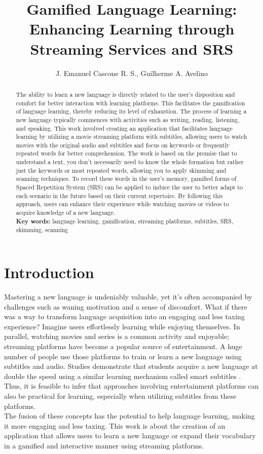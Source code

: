 \documentclass[12pt]{article}
\title{Gamified Language Learning: Enhancing Learning through Streaming Services and SRS}
\author{J. Emanuel Cascone R. S.\inst{1}, Guilherme A. Avelino\inst{1} }
\begin{document}
 

\maketitle

\begin{abstract} 
  The ability to learn a new language is directly related to the user's disposition and comfort for better interaction with learning platforms. This facilitates the gamification of language learning, thereby reducing its level of exhaustion. The process of learning a new language typically commences with activities such as writing, reading, listening, and speaking. This work involved creating an application that facilitates language learning by utilizing a movie streaming platform with subtitles, allowing users to watch movies with the original audio and subtitles and focus on keywords or frequently repeated words for better comprehension. The work is based on the premise that to understand a text, you don't necessarily need to know the whole formation but rather just the keywords or most repeated words, allowing you to apply skimming and scanning techniques. To record these words in the user's memory, gamified forms of Spaced Repetition System (SRS) can be applied to induce the user to better adapt to each scenario in the future based on their current repertoire. By following this approach, users can enhance their experience while watching movies or videos to acquire knowledge of a new language. \\
  \textbf{Key words:} language learning, gamification, streaming platforms, subtitles, SRS, skimming, scanning
\end{abstract} 
\newpage


\section{Introduction} 

Mastering a new language is undeniably valuable, yet it's often accompanied by challenges such as waning motivation and a sense of discomfort. What if there was a way to transform language acquisition into an engaging and less taxing experience? Imagine users effortlessly learning while enjoying themselves. 
In parallel, watching movies and series is a common activity and enjoyable; streaming platforms have become a popular source of entertainment. A huge number of people use those platforms to train or learn a new language using subtitles and audio.
Studies demonstrate that students acquire a new language at double the speed using a similar learning mechanism called smart subtitles \cite{Kovacs13}. Thus, it is feasible to infer that approaches involving entertainment platforms can also be practical for learning, especially when utilizing subtitles from these platforms. \\
The fusion of these concepts has the potential to help language learning, making it more engaging and less taxing. This work is about the creation of an application that allows users to learn a new language or expand their vocabulary in a gamified and interactive manner using streaming platforms.
\end{document}
